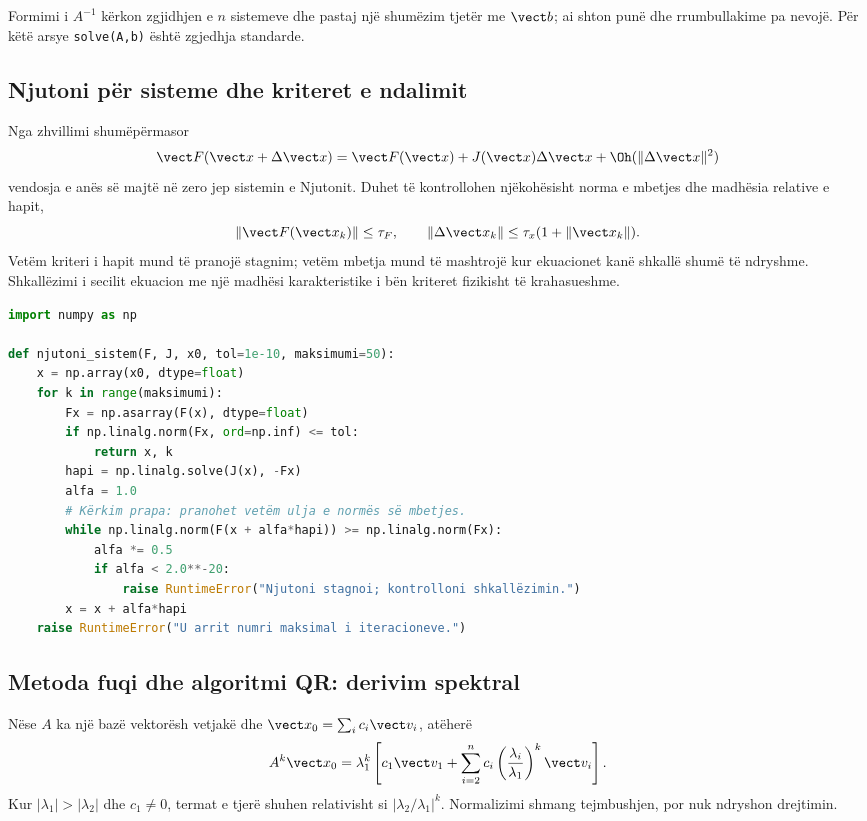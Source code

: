 Formimi i $A^{-1}$ kërkon zgjidhjen e $n$ sistemeve dhe pastaj një shumëzim tjetër me $\vect b$; ai shton punë dhe rrumbullakime pa nevojë. Për këtë arsye \texttt{solve(A,b)} është zgjedhja standarde.

\subsection{Njutoni për sisteme dhe kriteret e ndalimit}
Nga zhvillimi shumëpërmasor
\begin{equation}
 \vect F(\vect x+\Delta\vect x)=\vect F(\vect x)+J(\vect x)\Delta\vect x+\Oh(\|\Delta\vect x\|^2)
\end{equation}
vendosja e anës së majtë në zero jep sistemin e Njutonit. Duhet të kontrollohen njëkohësisht norma e mbetjes dhe madhësia relative e hapit,
\begin{equation}
 \|\vect F(\vect x_k)\|\le\tau_F,
 \qquad
 \|\Delta\vect x_k\|\le\tau_x(1+\|\vect x_k\|).
\end{equation}
Vetëm kriteri i hapit mund të pranojë stagnim; vetëm mbetja mund të mashtrojë kur ekuacionet kanë shkallë shumë të ndryshme. Shkallëzimi i secilit ekuacion me një madhësi karakteristike i bën kriteret fizikisht të krahasueshme.

\begin{lstlisting}[language=Python,caption={Njutoni i amortizuar për një sistem jolinear.}]
import numpy as np

def njutoni_sistem(F, J, x0, tol=1e-10, maksimumi=50):
    x = np.array(x0, dtype=float)
    for k in range(maksimumi):
        Fx = np.asarray(F(x), dtype=float)
        if np.linalg.norm(Fx, ord=np.inf) <= tol:
            return x, k
        hapi = np.linalg.solve(J(x), -Fx)
        alfa = 1.0
        # Kërkim prapa: pranohet vetëm ulja e normës së mbetjes.
        while np.linalg.norm(F(x + alfa*hapi)) >= np.linalg.norm(Fx):
            alfa *= 0.5
            if alfa < 2.0**-20:
                raise RuntimeError("Njutoni stagnoi; kontrolloni shkallëzimin.")
        x = x + alfa*hapi
    raise RuntimeError("U arrit numri maksimal i iteracioneve.")
\end{lstlisting}

\subsection{Metoda fuqi dhe algoritmi QR: derivim spektral}
Nëse $A$ ka një bazë vektorësh vetjakë dhe $\vect x_0=\sum_i c_i\vect v_i$, atëherë
\begin{equation}
 A^k\vect x_0=\lambda_1^k\left[c_1\vect v_1+
 \sum_{i=2}^{n}c_i\left(\frac{\lambda_i}{\lambda_1}\right)^k\vect v_i\right].
\end{equation}
Kur $|\lambda_1|>|\lambda_2|$ dhe $c_1\ne0$, termat e tjerë shuhen relativisht si $|\lambda_2/\lambda_1|^k$. Normalizimi shmang tejmbushjen, por nuk ndryshon drejtimin.

